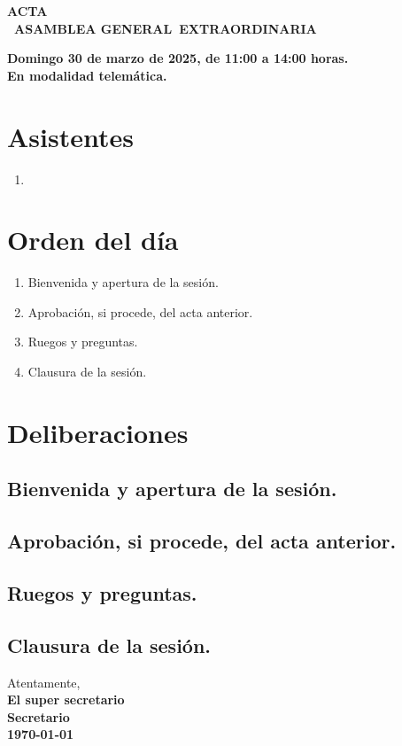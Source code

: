 \documentclass[a4paper,12pt]{article}
\newcommand{\firmanteNombre}{El super secretario} %
\newcommand{\firmanteCargo}{Secretario} %
\newcommand{\assemblyNumber}{1}
\newcommand{\assemblyName}{\Romannum{\assemblyNumber}~Asamblea General}
\newcommand{\assemblyEx}{\assemblyName~Extraordinaria}
\newcommand{\subject}{ACTA \\ \MakeUppercase{\assemblyEx}}
\begin{document}
\begin{center}
    \large \textbf{\subject}
\end{center}

\begin{center}
    \textbf{Domingo 30 de marzo de 2025, de 11:00 a 14:00 horas.\\
    En modalidad telemática.}
\end{center}

\vspace{0.5cm}

\tableofcontents
\newpage
{}

\section{Asistentes}

\begin{multicols}{2}
\begin{enumerate}
    \item[]
\end{enumerate}
\end{multicols}

\section{Orden del día}

\begin{enumerate}
    \item Bienvenida y apertura de la sesión.
    \item Aprobación, si procede, del acta anterior.
    \item Ruegos y preguntas.
    \item Clausura de la sesión.
\end{enumerate}

\section{Deliberaciones}

\subsection{Bienvenida y apertura de la sesión.}

\subsection{Aprobación, si procede, del acta anterior.}

\subsection{Ruegos y preguntas.}

\subsection{Clausura de la sesión.}


\vspace{1cm}
\noindent Atentamente,\\
\textbf{\firmanteNombre}\\ %
\textbf{\firmanteCargo}\\ %
\textbf{\today} %
\end{document}
